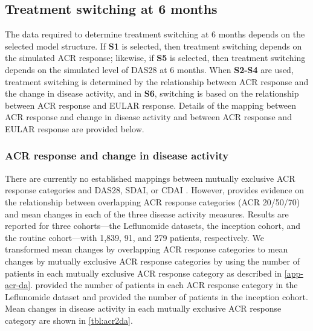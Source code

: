 \documentclass[11pt,final,fleqn]{article}\usepackage[]{graphicx}\usepackage[]{color}
\theoremstyle{plain}
\begin{document}
\subsection{Treatment switching at 6 months}
The data required to determine treatment switching at 6 months depends on the selected model structure. If \textbf{S1} is selected, then treatment switching depends on the simulated ACR response; likewise, if \textbf{S5} is selected, then treatment switching depends on the simulated level of DAS28 at 6 months. When \textbf{S2-S4} are used, treatment switching is determined by the relationship between ACR response and the change in disease activity, and in \textbf{S6}, switching is based on the relationship between ACR response and EULAR response. Details of the mapping between ACR response and change in disease activity and between ACR response and EULAR response are provided below.  

\subsubsection{ACR response and change in disease activity}
There are currently no established mappings between mutually exclusive ACR response categories and DAS28, SDAI, or CDAI \citep{madan2015consensus}. However, \citet{aletaha2005simplified} provides evidence on the relationship between overlapping ACR response categories (ACR 20/50/70) and mean changes in each of the three disease activity measures. Results are reported for three cohorts---the Leflunomide datasets, the inception cohort, and the routine cohort---with 1,839, 91, and 279 patients, respectively. We transformed mean changes by overlapping ACR response categories to mean changes by mutually exclusive ACR response categories by using the number of patients in each mutually exclusive ACR response category as described in \autoref{app-acr-da}. \citet{smolen2003simplified} provided the number of patients in each ACR response category in the Leflunomide dataset and \citet{aletaha2005acute} provided the number of patients in the inception cohort. Mean changes in disease activity in each mutually exclusive ACR response category are shown in \autoref{tbl:acr2da}.
\end{document}
